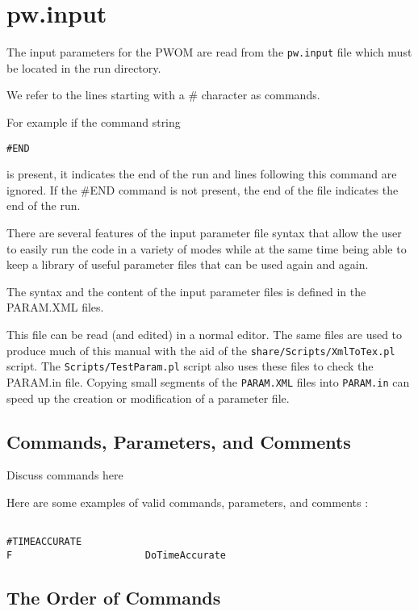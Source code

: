 %

\section{pw.input \label{section:param.in}}

The input parameters for the PWOM are read from the 
{\tt pw.input} file which must be located in the run directory.

We refer to the lines starting with a \# character as commands.

For example if the command string 
\begin{verbatim}
#END
\end{verbatim}
is present, it indicates the end of the run and lines following
this command are ignored. If the \#END command is not
present, the end of the file indicates the end of the run.

There are several features of the input parameter file syntax
that allow the user to easily run the code
in a variety of modes while at the same time being able to 
keep a library of useful parameter files that can be used
again and again.

The syntax and the content of the input parameter files
is defined in the PARAM.XML files. 

This file can be read (and edited) in a normal editor.
The same files are used to produce much of this
manual with the aid of the {\tt share/Scripts/XmlToTex.pl} script. 
The {\tt Scripts/TestParam.pl} script also uses these files
to check the PARAM.in file.
Copying small segments of the {\tt PARAM.XML} files
into {\tt PARAM.in} can speed up the creation or modification of a 
parameter file. 

\subsection{Commands, Parameters, and Comments \label{section:commands}}

Discuss commands here

Here are some examples of valid commands, parameters, and comments :

\begin{verbatim}

#TIMEACCURATE
F                       DoTimeAccurate

\end{verbatim}

\subsection{The Order of Commands \label{section:order}}

